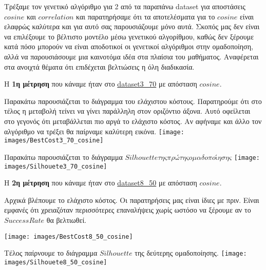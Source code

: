 Τρέξαμε τον γενετικό αλγόριθμο για 2 από τα παραπάνω dataset για αποστάσεις $cosine$ και $correlation$ και παρατηρήσαμε ότι τα αποτελέσματα για το $cosine$ είναι ελαφρώς καλύτερα και για αυτό σας παρουσιάζουμε μόνο αυτά. Σκοπός μας δεν είναι να επιλέξουμε το βέλτιστο μοντέλο μέσω γενετικού αλγορίθμου, καθώς δεν ξέρουμε κατά πόσο μπορούν να είναι αποδοτικοί οι γενετικοί αλγόριθμοι στην ομαδοποίηση, αλλά να παρουσιάσουμε μια καινοτόμα ιδέα στα πλαίσια του μαθήματος. Αναφέρεται στα ανοιχτά θέματα ότι επιδέχεται βελτιώσεις η όλη διαδικασία.

Η \textbf{1η μέτρηση} που κάναμε ήταν στο \url{dataset3_70} με απόσταση $cosine$.

\noindent\begin{minipage}{\linewidth}
Παρακάτω παρουσιάζεται το διάγραμμα του ελάχιστου κόστους. Παρατηρούμε ότι στο τέλος η μεταβολή τείνει να γίνει παράλληλη στον οριζόντιο άξονα. Αυτό οφείλεται στο γεγονός ότι μεταβάλλεται πιο αργά το ελάχιστο κόστος. Αν αφήναμε και άλλο τον αλγόριθμο να τρέξει θα παίρναμε καλύτερη εικόνα.
\centering
{}
\texttt{[image: images/BestCost3\_70\_cosine]}
\label{fig:Besto Cost}
\end{minipage}

\noindent\begin{minipage}{\linewidth}
Παρακάτω παρουσιάζεται το διάγραμμα $Silhouette της πρώτης ομαδοποίησης$
\centering
{}
\texttt{[image: images/Silhouete3\_70\_cosine]}
\end{minipage}

Η \textbf{2η μέτρηση} που κάναμε ήταν στο \url{dataset8_50} με απόσταση $cosine$.

Αρχικά βλέπουμε το ελάχιστο κόστος. Οι παρατηρήσεις μας είναι ίδιες με πριν. Είναι εμφανές ότι χρειαζόταν περισσότερες επαναλήψεις χωρίς ωστόσο να ξέρουμε αν το $Success Rate$ θα βελτιωθεί.

\noindent\begin{minipage}{\linewidth}
\centering
{}
\texttt{[image: images/BestCost8\_50\_cosine]}
\label{fig:Best Cost}
\end{minipage}

\noindent\begin{minipage}{\linewidth}
Τέλος παίρνουμε το διάγραμμα $Silhouette$ της δεύτερης ομαδοποίησης.
\centering
{}
\texttt{[image: images/Silhouete8\_50\_cosine]}
\label{fig:Silhouette}
\end{minipage}

